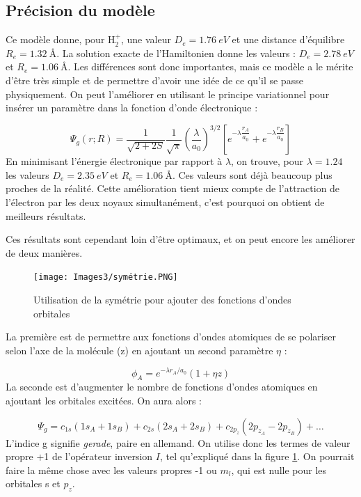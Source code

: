 \subsection{Précision du modèle}


Ce modèle donne, pour H$_2^+$, une valeur $D_e = \SI{1.76}{eV}$ et une distance d'équilibre $R_e = \SI{1.32}{\angstrom}$. La solution exacte de l'Hamiltonien donne les valeurs : $D_e = \SI{2.78}{eV}$ et $R_e=\SI{1.06}{\angstrom}$. Les différences sont donc importantes, mais ce modèle a le mérite d'être très simple et de permettre d'avoir une idée de ce qu'il se passe physiquement. On peut l'améliorer en utilisant le principe variationnel pour insérer un paramètre dans la fonction d'onde électronique :

\[
\Psi_g(r;R) = \dfrac{1}{\sqrt{2+2S}}\dfrac{1}{\sqrt{\pi}}\left(\dfrac{\lambda}{a_0}\right)^{3/2}\left[e^{-\lambda\dfrac{r_A}{a_0}} + e^{-\lambda\dfrac{r_B}{a_0}}\right]
\]
En minimisant l'énergie électronique par rapport à $\lambda$, on trouve, pour $\lambda = 1.24$ les valeurs $D_e = \SI{2.35}{eV}$ et $R_e = \SI{1.06}{\angstrom}$. Ces valeurs sont déjà beaucoup plus proches de la réalité. Cette amélioration tient mieux compte de l'attraction de l'électron par les deux noyaux simultanément, c'est pourquoi on obtient de meilleurs résultats. 

Ces résultats sont cependant loin d'être optimaux, et on peut encore les améliorer de deux manières.
\begin{figure}[htpb]
    \centering
    \texttt{[image: Images3/symétrie.PNG]}
    \caption{Utilisation de la symétrie pour ajouter des fonctions d'ondes orbitales}
    \label{fig:sym}
\end{figure}
La première est de permettre aux fonctions d'ondes atomiques de se polariser selon l'axe de la molécule (z) en ajoutant un second paramètre $\eta$ :

\[ \phi_A = e^{-\lambda r_A/a_0}(1+\eta z) \]
La seconde est d'augmenter le nombre de fonctions d'ondes atomiques en ajoutant les orbitales excitées. On aura alors :

\[ \Psi_g = c_{1s}(1s_A+1s_B) + c_{2s}(2s_A+2s_B) + c_{2p_z}(2p_{z_A}-2p_{z_B}) + \dots \]
L'indice g signifie \textit{gerade}, paire en allemand. On utilise donc les termes de valeur propre +1 de l'opérateur inversion $I$, tel qu'expliqué dans la figure \ref{fig:sym}.
On pourrait faire la même chose avec les valeurs propres -1 ou $m_l$, qui est nulle pour les orbitales s et $p_z$.



